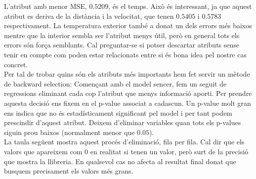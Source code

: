 \documentclass[a4paper, 11pt]{article}
\begin{document}
        L'atribut amb menor MSE, $0.5209$, és el temps. Això és interessant, ja que aquest atribut
        es deriva de la distància i la velocitat, que tenen $0.5405$ i $0.5783$ respectivament. La
        temperatura exterior també a donat un dels errors més baixos mentre que la interior sembla
        ser l’atribut menys útil, però en general tots els errors són força semblants. Cal
        preguntar-se si potser descartar atributs sense tenir en compte com poden estar relacionats
        entre si és bona idea pel nostre cas concret.\\


        Per tal de trobar quins són els atributs més importants hem fet servir un mètode de backward
        selection: Començant amb el model sencer, fem un seguit de regressions eliminant cada cop
        l'atribut que menys informació aporti. Per prendre aquesta decisió ens fixem en el p-value
        associat a cadascun. Un p-value molt gran ens indica que no és estadísticament significant
        pel model i per tant podem prescindir d'aquest atribut. Deixem d’eliminar variables quan
        tots els p-values siguin prou baixos (normalment menor que $0.05$).\\

        La taula següent mostra aquest procés d'eliminació, fila per fila. Cal dir que els valors
        que apareixem com 0 en realitat si tenen un valor, però surt de la precisió que mostra la
        llibreria.
        En qualsevol cas no afecta al resultat final donat que busquem precisament els valors més
        grans.\\
\end{document}
